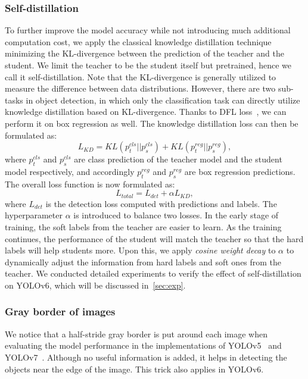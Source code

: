 \documentclass[10pt,twocolumn,letterpaper]{article}
\begin{document}
  \subsubsection{Self-distillation}
  To further improve the model accuracy while not introducing much additional computation cost, we apply the classical knowledge distillation technique minimizing the KL-divergence between the prediction of the teacher and the student. We limit the teacher to be the student itself but pretrained, hence we call it self-distillation. Note that the KL-divergence is generally utilized to measure the difference between data distributions. However, there are two sub-tasks in object detection, in which only the classification task can directly utilize knowledge distillation based on KL-divergence. Thanks to DFL loss~\cite{li2020generalized}, we can perform it on box regression as well. The knowledge distillation loss can then be formulated as: 
 \begin{equation}
 L_{KD} = KL(p_t^{cls}||p_s^{cls}) + KL(p_t^{reg}||p_s^{reg}),
 \end{equation}
 where $p_t^{cls}$ and $p_s^{cls}$ are class prediction of the teacher model and the student model respectively, and accordingly $p_t^{reg}$ and $p_s^{reg}$ are box regression predictions. The overall loss function is now formulated as:
 \begin{equation}
 L_{total} = L_{det} + \alpha L_{KD},
 \end{equation}
 where $L_{det}$ is the detection loss computed with predictions and labels. The hyperparameter $\alpha$ is introduced to balance two losses. In the early stage of training, the soft labels from the teacher are easier to learn. As the training continues, the performance of the student will match the teacher so that the hard labels will help students more. Upon this, we apply \emph{cosine weight decay} to $\alpha$ to dynamically adjust the information from hard labels and soft ones from the teacher. We conducted detailed experiments to verify the effect of self-distillation on YOLOv6, which will be discussed in~\cref{sec:exp}.
 


 \subsubsection{Gray border of images}
 \label{sec:method:further:gray}
 We notice that a half-stride gray border is put around each image when evaluating the model performance in the implementations of YOLOv5~\cite{yolov5} and YOLOv7~\cite{wang2022yolov7}. Although no useful information is added, it helps in detecting the objects near the edge of the image. This trick also applies in  YOLOv6. 
 
\end{document}
